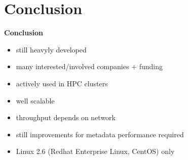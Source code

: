 \section{Conclusion}
\begin{frame}{\textbf{Conclusion}}
    \begin{itemize}
        \item still heavyly developed
        \item many interested/involved companies + funding
        \item actively used in HPC clusters
        \item well scalable
        \item throughput depends on network
        \item still improvements for metadata performance required
        \item Linux 2.6 (Redhat Enterprise Linux, CentOS) only
    \end{itemize}
\end{frame}
